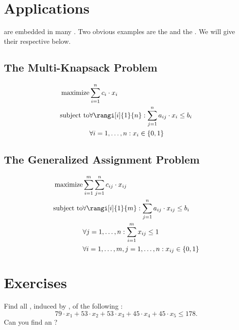 \section{Applications}

 are embedded in many . Two obvious examples are the  and the . We will give their respective  below.

\subsection{The Multi-Knapsack Problem}

\begin{eqnarray}
\mbox{maximize}&\sumieqb[i]{1}{n}{c_i\cdot x_i}\\
\mbox{subject to}&\forall\rangi[i]{1}{n}:\sumieqb[j]{1}{n}{a_{ij}\cdot x_i}\leq b_i\\
&\forall\rangei[i]{1}{n}:x_i\in\accl{0,1}
\end{eqnarray}

\subsection{The Generalized Assignment Problem}

\begin{eqnarray}
\mbox{maximize}&\sumieqb[i]{1}{m}{\sumieqb[j]{1}{n}{c_{ij}\cdot x_{ij}}}\\
\mbox{subject to}&\forall\rangi[i]{1}{m}:\sumieqb[j]{1}{n}{a_{ij}\cdot x_{ij}}\leq b_i\\
&\forall\rangei[j]{1}{n}:\sumieqb[i]{1}{m}x_{ij}\leq 1\\
&\forall\rangei[i]{1}{m},\rangei[j]{1}{n}:x_{ij}\in\accl{0,1}
\end{eqnarray}

\section*{Exercises}
\begin{exercise}
Find all , induced by , of the following :
\begin{equation}
79\cdot x_1+53\cdot x_2+53\cdot x_3+45\cdot x_4+45\cdot x_5\leq178.
\end{equation}
Can you find an ?
\end{exercise}

